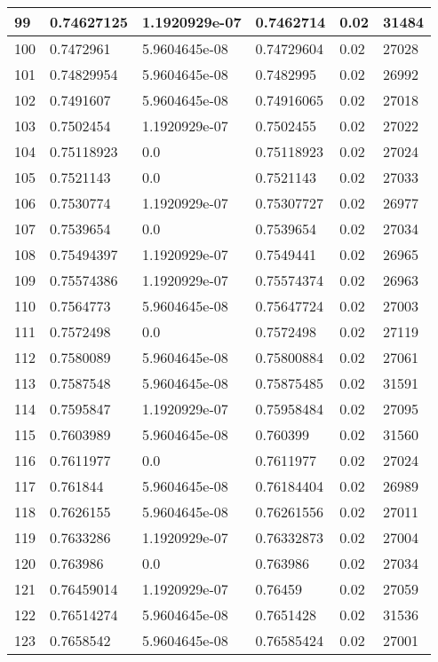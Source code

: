 \begin{longtable}{|l|l|l|l|l|l|}
99 & 0.74627125 & 1.1920929e-07 & 0.7462714 & 0.02 & 31484 \\ \hline 
100 & 0.7472961 & 5.9604645e-08 & 0.74729604 & 0.02 & 27028 \\ \hline 
101 & 0.74829954 & 5.9604645e-08 & 0.7482995 & 0.02 & 26992 \\ \hline 
102 & 0.7491607 & 5.9604645e-08 & 0.74916065 & 0.02 & 27018 \\ \hline 
103 & 0.7502454 & 1.1920929e-07 & 0.7502455 & 0.02 & 27022 \\ \hline 
104 & 0.75118923 & 0.0 & 0.75118923 & 0.02 & 27024 \\ \hline 
105 & 0.7521143 & 0.0 & 0.7521143 & 0.02 & 27033 \\ \hline 
106 & 0.7530774 & 1.1920929e-07 & 0.75307727 & 0.02 & 26977 \\ \hline 
107 & 0.7539654 & 0.0 & 0.7539654 & 0.02 & 27034 \\ \hline 
108 & 0.75494397 & 1.1920929e-07 & 0.7549441 & 0.02 & 26965 \\ \hline 
109 & 0.75574386 & 1.1920929e-07 & 0.75574374 & 0.02 & 26963 \\ \hline 
110 & 0.7564773 & 5.9604645e-08 & 0.75647724 & 0.02 & 27003 \\ \hline 
111 & 0.7572498 & 0.0 & 0.7572498 & 0.02 & 27119 \\ \hline 
112 & 0.7580089 & 5.9604645e-08 & 0.75800884 & 0.02 & 27061 \\ \hline 
113 & 0.7587548 & 5.9604645e-08 & 0.75875485 & 0.02 & 31591 \\ \hline 
114 & 0.7595847 & 1.1920929e-07 & 0.75958484 & 0.02 & 27095 \\ \hline 
115 & 0.7603989 & 5.9604645e-08 & 0.760399 & 0.02 & 31560 \\ \hline 
116 & 0.7611977 & 0.0 & 0.7611977 & 0.02 & 27024 \\ \hline 
117 & 0.761844 & 5.9604645e-08 & 0.76184404 & 0.02 & 26989 \\ \hline 
118 & 0.7626155 & 5.9604645e-08 & 0.76261556 & 0.02 & 27011 \\ \hline 
119 & 0.7633286 & 1.1920929e-07 & 0.76332873 & 0.02 & 27004 \\ \hline 
120 & 0.763986 & 0.0 & 0.763986 & 0.02 & 27034 \\ \hline 
121 & 0.76459014 & 1.1920929e-07 & 0.76459 & 0.02 & 27059 \\ \hline 
122 & 0.76514274 & 5.9604645e-08 & 0.7651428 & 0.02 & 31536 \\ \hline 
123 & 0.7658542 & 5.9604645e-08 & 0.76585424 & 0.02 & 27001 \\ \hline 

\end{longtable}
